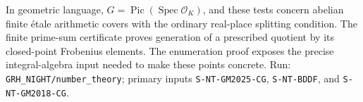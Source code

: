 In geometric language, \(G=\operatorname{Pic}
(\operatorname{Spec}\mathcal O_K)\), and these tests concern
abelian finite \'etale arithmetic covers with the ordinary
real-place splitting condition. The finite prime-sum
certificate proves generation of a prescribed quotient
by its closed-point Frobenius elements. The enumeration
proof exposes the precise integral-algebra input needed
to make these points concrete. Run:
\texttt{GRH\_NIGHT/number\_theory}; primary inputs
\texttt{S-NT-GM2025-CG}, \texttt{S-NT-BDDF},
and \texttt{S-NT-GM2018-CG}.

